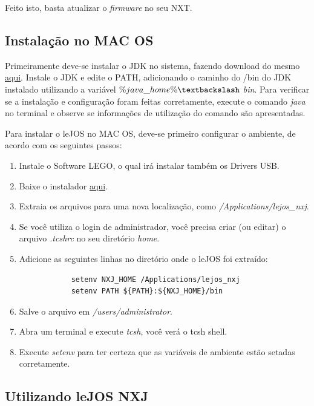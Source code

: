 	Feito isto, basta atualizar o \textit{firmware} no seu NXT.

\subsection{Instalação no MAC OS} %
\label{sub:instalação_no_mac_os}

	Primeiramente deve-se instalar o JDK no sistema, fazendo download do mesmo \href{http://www.oracle.com/technetwork/java/}{aqui}. Instale o JDK e edite o PATH, adicionando o caminho do /bin do JDK instalado utilizando a variável \textit{$\%java\_home\% \textbackslash$ bin}. Para verificar se a instalação e configuração foram feitas corretamente, execute o comando \textit{java} no terminal e observe se informações de utilização do comando são apresentadas.

	Para instalar o leJOS no MAC OS, deve-se primeiro configurar o ambiente, de acordo com os seguintes passos:

	\begin{enumerate}
		\item Instale o Software LEGO, o qual irá instalar também os Drivers USB.
		\item Baixe o instalador \href{www.lejos.org}{aqui}.
		\item Extraia os arquivos para uma nova localização, como \textit{/Applications/lejos\_nxj}.
		\item Se você utiliza o login de administrador, você precisa criar (ou editar) o arquivo \textit{.tcshrc} no seu diretório \textit{home}.
		\item Adicione as seguintes linhas no diretório onde o leJOS foi extraído:
		\begin{lstlisting}
			setenv NXJ_HOME /Applications/lejos_nxj
			setenv PATH ${PATH}:${NXJ_HOME}/bin
		\end{lstlisting}
		\item Salve o arquivo em \textit{/users/administrator}.
		\item Abra um terminal e execute \textit{tcsh}, você verá o tcsh shell.
		\item Execute \textit{setenv} para ter certeza que as variáveis de ambiente estão setadas corretamente.
	\end{enumerate}

\subsection{Utilizando leJOS NXJ} %
\label{sub:utilizando_lejos_nxj}

